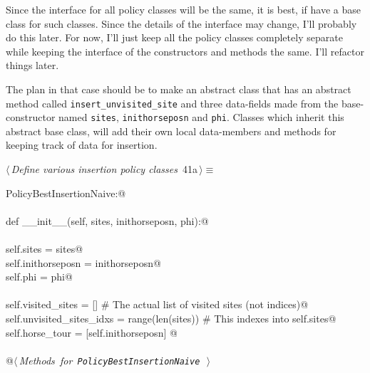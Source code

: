 \documentclass[11.5pt]{report}
\begin{document}
\newchunk Since the interface for all policy classes will be the same, it is 
best, if have a base class for such classes. Since the details of 
the interface may change, I'll probably do this later. For now, 
I'll just keep all the policy classes completely separate while 
keeping the interface of the constructors and methods the same. 
I'll refactor things later. 

The plan in that case should be to make an abstract class that 
has an abstract method called \texttt{insert\_unvisited\_site}
and three data-fields made from the base-constructor named \texttt{sites}, \texttt{inithorseposn}
and \texttt{phi}. Classes which inherit this abstract base class, will 
add their own local data-members and methods for keeping track of 
data for insertion. 

\begin{flushleft} \small\label{scrap58}\raggedright\small
{} $\langle\,${\itshape Define various insertion policy classes}\nobreak\ {\footnotesize {41a}}$\,\rangle\equiv$
\vspace{-1ex}
\begin{list}{}{} \item
\mbox{}\verb@class PolicyBestInsertionNaive:@\\
\mbox{}\verb@@\\
\mbox{}\verb@    def __init__(self, sites, inithorseposn, phi):@\\
\mbox{}\verb@@\\
\mbox{}\verb@         self.sites           = sites@\\
\mbox{}\verb@         self.inithorseposn   = inithorseposn@\\
\mbox{}\verb@         self.phi             = phi@\\
\mbox{}\verb@@\\
\mbox{}\verb@         self.visited_sites        = []                # The actual list of visited sites (not indices)@\\
\mbox{}\verb@         self.unvisited_sites_idxs = range(len(sites)) # This indexes into self.sites@\\
\mbox{}\verb@         self.horse_tour           = [self.inithorseposn]         @\\
\mbox{}\verb@@\\
\mbox{}\verb@    @\hbox{$\langle\,${\itshape Methods for \verb|PolicyBestInsertionNaive|}\nobreak\ {\footnotesize {}}$\,\rangle$}\verb@@\\
\mbox{}\verb@@{\NWsep}
\end{list}

\end{flushleft}
\end{document}
